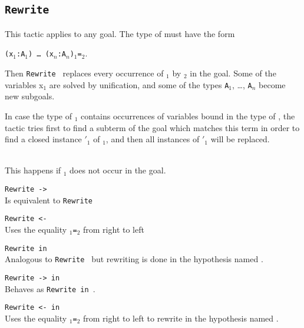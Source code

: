 \subsection{\tt Rewrite \term}
\label{Rewrite}
This tactic applies to any goal. The type of {\term}
must have the form

\texttt{(x$_1$:A$_1$) \dots\ (x$_n$:A$_n$)}\term$_1${\tt =}\term$_2$. 

\noindent Then {\tt Rewrite \term} replaces every occurrence of 
\term$_1$ by \term$_2$ in the goal. Some of the variables x$_1$ are
solved by unification, and some of the types \texttt{A}$_1$, \dots,
\texttt{A}$_n$ become new subgoals.

\Rem In case the type of  
\term$_1$ contains occurrences of variables bound in the
type of \term, the tactic tries first to find a subterm of the goal
which matches this term in order to find a closed instance \term$'_1$
of \term$_1$, and then all instances of \term$'_1$ will be replaced.

\begin{ErrMsgs}
\item {}

\item {}\\
This happens if \term$_1$ does not occur in the goal.
\end{ErrMsgs}

\begin{Variants}
\item {\tt Rewrite -> {\term}}\\
  Is equivalent to {\tt Rewrite \term}

\item {\tt Rewrite <- {\term}}\\
  Uses the equality \term$_1${\tt=}\term$_2$ from right to left

\item {\tt Rewrite {\term} in {\ident}}
  \\
  Analogous to  {\tt Rewrite {\term}} but rewriting is done in the
  hypothesis named {\ident}.

\item {\tt Rewrite -> {\term} in {\ident}}
  \\
  Behaves as {\tt Rewrite {\term} in {\ident}}.
 
\item {\tt Rewrite <- {\term} in {\ident}}\\
  Uses the equality \term$_1${\tt=}\term$_2$ from right to left to
  rewrite in the hypothesis named {\ident}.
\end{Variants}


